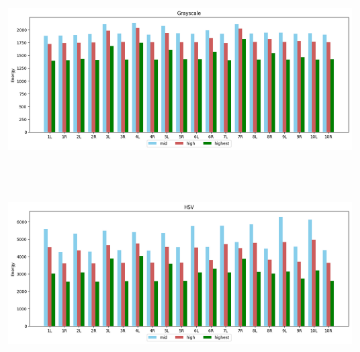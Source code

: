 \begin{figure}[!htb]
    \caption{Coin "o" STFT approach with Flattop window for Grayscale (a) and HSV (b) colourspaces.}
    \centering
    \begin{subfigure}{\textwidth}
        \centering
        \includegraphics[scale=0.4]{images/appendix/stft/coin_o/flattop_Grayscale.png}
        \caption{}
    \end{subfigure}\\
    \begin{subfigure}{\textwidth}
         \centering
          \includegraphics[scale=0.4]{images/appendix/stft/coin_o/flattop_HSV.png}
          \caption{}
    \end{subfigure}
    \fautor
\end{figure}

